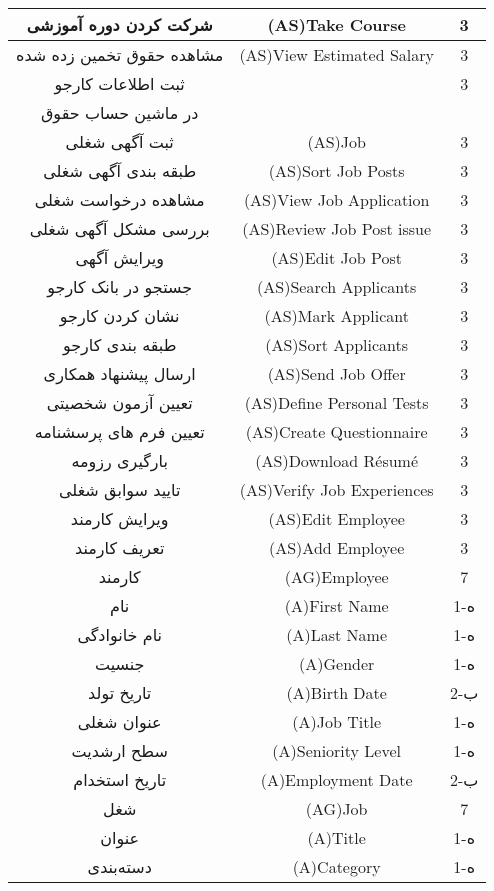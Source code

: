 \documentclass[12pt]{article}
\begin{document}
\begin{longtable}{|c|c|c|}
		\hline
		شرکت کردن دوره آموزشی & (AS)Take Course & 3     \\
		\hline
		مشاهده حقوق تخمین زده شده & (AS)View Estimated Salary & 3     \\
		\hline
		ثبت اطلاعات کارجو & 
		\lr{(AS)Submit Applicant Info } & 3 \\
		در ماشین حساب حقوق &
		\lr{in Salary Calculator} & \\
		\hline
		ثبت آگهی شغلی & (AS)Job  & 3     \\
		\hline
		طبقه بندی آگهی شغلی & (AS)Sort Job Posts & 3     \\
		\hline
		مشاهده درخواست شغلی & (AS)View Job Application & 3     \\
		\hline
		بررسی مشکل آگهی شغلی & (AS)Review Job Post issue & 3     \\
		\hline
		ویرایش آگهی & (AS)Edit Job Post & 3     \\
		\hline
		جستجو در بانک کارجو & (AS)Search Applicants & 3     \\
		\hline
		نشان کردن کارجو & (AS)Mark Applicant & 3     \\
		\hline
		طبقه بندی کارجو & (AS)Sort Applicants & 3     \\
		\hline
		ارسال پیشنهاد همکاری & (AS)Send Job Offer & 3     \\
		\hline
		تعیین آزمون شخصیتی & (AS)Define Personal Tests & 3     \\
		\hline
		تعیین فرم های پرسشنامه & (AS)Create Questionnaire & 3     \\
		\hline
		بارگیری رزومه & (AS)Download Résumé & 3     \\
		\hline
		تایید سوابق شغلی & (AS)Verify Job Experiences & 3     \\
		\hline
		ویرایش کارمند & (AS)Edit Employee & 3     \\
		\hline
		تعریف کارمند & (AS)Add Employee & 3     \\
		\hline
		کارمند & (AG)Employee & 7     \\
		\hline
		نام & (A)First Name & 1-ه   \\
		\hline
		نام خانوادگی & (A)Last Name & 1-ه   \\
		\hline
		جنسیت & (A)Gender & 1-ه   \\
		\hline
		تاریخ تولد & (A)Birth Date & 2-ب   \\
		\hline
		عنوان شغلی & (A)Job Title & 1-ه   \\
		\hline
		سطح ارشدیت & (A)Seniority Level & 1-ه   \\
		\hline
		تاریخ استخدام & (A)Employment Date & 2-ب   \\
		\hline
		شغل & (AG)Job & 7     \\
		\hline
		عنوان & (A)Title & 1-ه   \\
		\hline
		دسته‌بندی & (A)Category & 1-ه   \\
		\hline
	\end{longtable}
	
\end{document}
